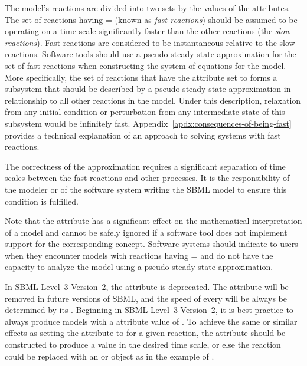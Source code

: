 The model's reactions are divided into two sets by the
values of the  attributes.  The set of reactions
having = (known as \emph{fast reactions})
should be assumed to be operating on a time scale significantly
faster than the other reactions (the \emph{slow reactions}).  Fast
reactions are considered to be instantaneous relative to the slow
reactions.  Software tools should use a pseudo steady-state
approximation for the set of fast reactions when constructing the
system of equations for the model.  More specifically, the set of
reactions that have the  attribute set to 
forms a subsystem that should be described by a pseudo
steady-state approximation in relationship to all other reactions
in the model.  Under this description, relaxation from any initial
condition or perturbation from any intermediate state of this
subsystem would be infinitely fast.
Appendix~\ref{apdx:consequences-of-being-fast} provides a
technical explanation of an approach to solving systems with fast
reactions.

The correctness of the approximation requires a significant
separation of time scales between the fast reactions and other
processes.  It is the responsibility of the modeler or of the
software system writing the SBML model to ensure this condition is
fulfilled.

Note that the  attribute has a significant effect on
the mathematical interpretation of a model and cannot be safely
ignored if a software tool does not implement support for the
corresponding concept.  Software systems should indicate to users
when they encounter models with reactions having
= and do not have the capacity to analyze
the model using a pseudo steady-state approximation.

\begin{blockChanged}
In SBML Level~3 Version~2, the  attribute is deprecated.  The attribute will be removed in future versions of SBML, and the speed of every \Reaction will be always be determined by its \KineticLaw.  Beginning in SBML Level~3 Version~2, it is best practice to always produce models with a  attribute value of .  To achieve the same or similar effects as setting the  attribute to  for a given reaction, the \KineticLaw attribute should be constructed to produce a value in the desired time scale, or else the reaction could be replaced with an \AssignmentRule or \AlgebraicRule object as in the example of .
\end{blockChanged}


